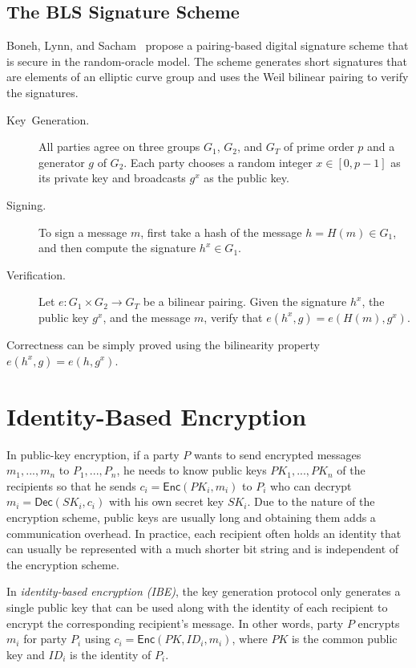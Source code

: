 \documentclass[11pt]{article}
\theoremstyle{plain}
\begin{document}
\subsection{The BLS Signature Scheme}

Boneh, Lynn, and Sacham~\cite{Boneh:2001:SSW:647097.717005} propose
a pairing-based\emph{ }digital signature scheme that is secure in
the random-oracle model. The scheme generates short signatures that
are elements of an elliptic curve group and uses the Weil bilinear
pairing to verify the signatures.
\begin{description}
	\item [{Key~Generation.}] All parties agree on three groups $G_{1}$,
	$G_{2}$, and $G_{T}$ of prime order $p$ and a generator $g$ of
	$G_{2}$. Each party chooses a random integer $x\in[0,p-1]$ as its
	private key and broadcasts $g^{x}$ as the public key.
	\item [{Signing.}] To sign a message $m$, first take a hash of the message
	$h=H(m)\in G_{1}$, and then compute the signature $h^{x}\in G_{1}$.
	\item [{Verification.}] Let $e:G_{1}\times G_{2}\to G_{T}$ be a bilinear
	pairing. Given the signature $h^{x}$, the public key $g^{x}$, and
	the message $m$, verify that $e(h^{x},g)=e(H(m),g^{x})$.
\end{description}
Correctness can be simply proved using the bilinearity property $e(h^{x},g)=e(h,g^{x})$.

\section{Identity-Based Encryption}

In public-key encryption, if a party $P$ wants to send encrypted
messages $m_{1},...,m_{n}$ to $P_{1},...,P_{n}$, he needs to know
public keys $PK_{1},...,PK_{n}$ of the recipients so that he sends
$c_{i}=\mathsf{Enc}(PK_{i},m_{i})$ to $P_{i}$ who can decrypt $m_{i}=\mathsf{Dec}(SK_{i},c_{i})$
with his own secret key $SK_{i}$. Due to the nature of the encryption
scheme, public keys are usually long and obtaining them adds a communication
overhead. In practice, each recipient often holds an identity that
can usually be represented with a much shorter bit string and is independent
of the encryption scheme.

In \emph{identity-based encryption (IBE)}, the key generation protocol
only generates a single public key that can be used along with the
identity of each recipient to encrypt the corresponding recipient's
message. In other words, party $P$ encrypts $m_{i}$ for party $P_{i}$
using $c_{i}=\mathsf{Enc}(PK,ID_{i},m_{i})$, where $PK$ is the common
public key and $ID_{i}$ is the identity of $P_{i}$.
\end{document}
